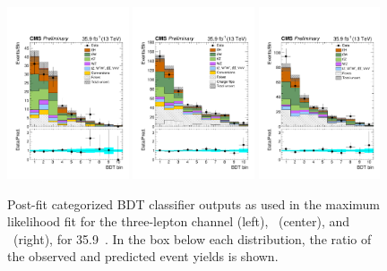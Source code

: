 \begin{figure}[!htb]
  \begin{center}
    \includegraphics[width=0.32\textwidth]{Figures/postfit/tHq_3l_13TeV_fit_s.pdf}
    \includegraphics[width=0.32\textwidth]{Figures/postfit/tHq_2lss_em_13TeV_fit_s.pdf} 
    \includegraphics[width=0.32\textwidth]{Figures/postfit/tHq_2lss_mm_13TeV_fit_s.pdf}
  \end{center}
  \caption{Post-fit categorized BDT classifier outputs as used in the maximum likelihood fit for the three-lepton channel (left), \emu\ (center), and \mumu\ (right), for 35.9~\fbinv.
  In the box below each distribution, the ratio of the observed and predicted event yields is shown.
  \label{fig:finalbins}}
\end{figure}


